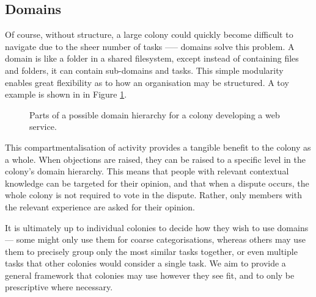 \subsection{Domains}\label{sec:domains}

Of course, without structure, a large colony could quickly become difficult to navigate due to the sheer number of tasks —-- domains solve this problem. A domain is like a folder in a shared filesystem, except instead of containing files and folders, it can contain sub-domains and tasks. This simple modularity enables great flexibility as to how an organisation may be structured. A toy example is shown in in Figure \ref{fig:domainhierarchysample}. 

\begin{figure}[h]
    \centering
 \caption{Parts of a possible domain hierarchy for a colony developing a web service.}
 \label{fig:domainhierarchysample}

\end{figure}

This compartmentalisation of activity provides a tangible benefit to the colony as a whole. When objections are raised, they can be raised to a specific level in the colony's domain hierarchy. This means that people with relevant contextual knowledge can be targeted for their opinion, and that when a dispute occurs, the whole colony is not required to vote in the dispute. Rather, only members with the relevant experience are asked for their opinion.

It is ultimately up to individual colonies to decide how they wish to use domains --- some might only use them for coarse categorisations, whereas others may use them to precisely group only the most similar tasks together, or even multiple tasks that other colonies would consider a single task. We aim to provide a general framework that colonies may use however they see fit, and to only be prescriptive where necessary.

